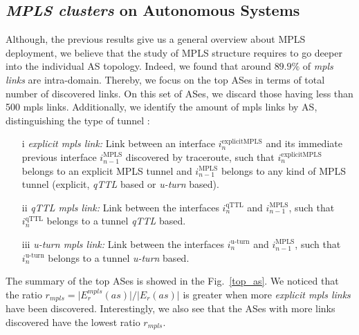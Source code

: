 \subsection{\textit{MPLS clusters} on Autonomous Systems}\label{cluster.as}
Although, the previous results give us a general overview about MPLS deployment,
we believe that the study of MPLS structure requires to go deeper into the
individual AS topology. Indeed, we found that around $89.9\%$ of \textit{mpls
links} are intra-domain. Thereby, we focus on the top ASes in terms of total
number of discovered links.  On this set of ASes, we discard those having less
than 500 mpls links. Additionally, we identify the amount of mpls
links by AS, distinguishing the type of tunnel :

\begin{itemize}
  \item[i] \textit{explicit mpls link:} Link between an interface
  $i^{\text{explicitMPLS}}_{n}$  and its immediate previous interface
  $i^{\text{MPLS}}_{n-1}$ discovered by traceroute, such that
  $i^{\text{explicitMPLS}}_{n}$ belongs to an explicit MPLS tunnel and
  $i^{\text{MPLS}}_{n-1}$ belongs to any kind of MPLS tunnel (explicit,
  \textit{qTTL} based or \textit{u-turn} based).
  \item[ii] \textit{qTTL mpls link:} Link between the interfaces
  $i^{\text{qTTL}}_{n}$  and $i^{\text{MPLS}}_{n-1}$, such that
  $i^{\text{qTTL}}_{n}$ belongs to a tunnel \textit{qTTL} based.
  \item[iii] \textit{u-turn mpls link:} Link between the interfaces
  $i^{\text{u-turn}}_{n}$  and $i^{\text{MPLS}}_{n-1}$, such that
  $i^{\text{u-turn}}_{n}$ belongs to a tunnel \textit{u-turn} based.
\end{itemize}

The summary of the top ASes is showed in the Fig.~\ref{top_as}.
We noticed that the ratio $r_{mpls}= \vert E^{mpls}_{r} (as) \vert /\vert E_{r}
(as) \vert $  is greater when more  \textit{explicit mpls links} have been
discovered. Interestingly, we also see that the ASes with more links discovered
have the lowest ratio $r_{mpls}$.

